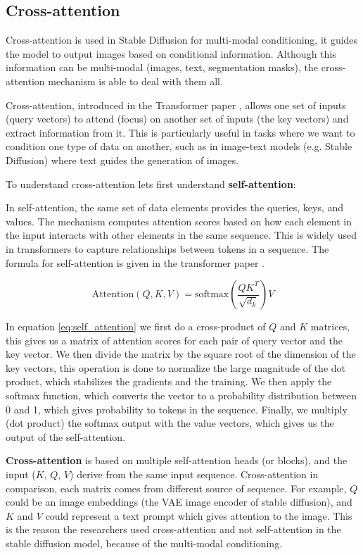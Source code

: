 \subsection{Cross-attention}
\label{subsec:cross_attention}

Cross-attention is used in Stable Diffusion for multi-modal conditioning, it guides the model to output images based on conditional information. Although this information can be multi-modal (images, text, segmentation masks), the cross-attention mechanism is able to deal with them all.

Cross-attention, introduced in the Transformer paper \cite{transformer}, allows one set of inputs (query vectors) to attend (focus) on another set of inputs (the key vectors) and extract information from it. This is particularly useful in tasks where we want to condition one type of data on another, such as in image-text models (e.g. Stable Diffusion) where text guides the generation of images.

To understand cross-attention lets first understand \textbf{self-attention}:

In self-attention, the same set of data elements provides the queries, keys, and values. The mechanism computes attention scores based on how each element in the input interacts with other elements in the same sequence. This is widely used in transformers to capture relationships between tokens in a sequence. The formula for self-attention is given in the transformer paper \cite{transformer}.

\begin{equation}
    \text{Attention}(Q, K, V) = \text{softmax} \left( \frac{QK^T}{\sqrt{d_k}} \right) V
    \label{eq:self_attention}
\end{equation}

In equation \ref{eq:self_attention} we first do a cross-product of $Q$ and $K$ matrices, this gives us a matrix of attention scores for each pair of query vector and the key vector. We then divide the matrix by the square root of the dimension of the key vectors, this operation is done to normalize the large magnitude of the dot product, which stabilizes the gradients and the training. We then apply the softmax function, which converts the vector to a probability distribution between 0 and 1, which gives probability to tokens in the sequence. Finally, we multiply (dot product) the softmax output with the value vectors, which gives us the output of the self-attention.

\textbf{Cross-attention} is based on multiple self-attention heads (or blocks), and the input ($K$, $Q$, $V$) derive from the same input sequence. Cross-attention in comparison, each matrix comes from different source of sequence. For example, $Q$ could be an image embeddings (the VAE image encoder of stable diffusion), and $K$ and $V$ could represent a text prompt which gives attention to the image. This is the reason the researchers used cross-attention and not self-attention in the stable diffusion model, because of the multi-modal conditioning.

